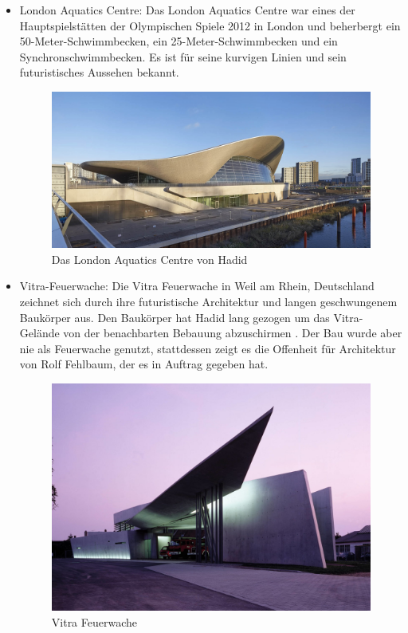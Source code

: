 \documentclass[a4paper]{article}
\begin{document}
\begin{itemize}
\item London Aquatics Centre: Das London Aquatics Centre war eines der
	Hauptspielstätten der Olympischen Spiele 2012 in London und beherbergt ein
	50-Meter-Schwimmbecken, ein 25-Meter-Schwimmbecken und ein
	Synchronschwimmbecken. Es ist für seine kurvigen Linien und sein
	futuristisches Aussehen bekannt.
\begin{figure}[h]
\centering
\includegraphics[width=.5\linewidth]{hadid-aquatics.jpg}
\caption{Das London Aquatics Centre von Hadid \cite{hadid_aquatics_centre}}
\end{figure}


\item Vitra-Feuerwache: Die Vitra Feuerwache in Weil am Rhein, Deutschland
	zeichnet sich durch ihre futuristische Architektur und langen geschwungenem
	Baukörper aus. Den Baukörper hat Hadid lang gezogen um das Vitra-Gelände von
	der benachbarten Bebauung abzuschirmen \cite[S. 26-29]{taschen_zaha_hadid}.
	Der Bau wurde aber nie als Feuerwache genutzt, stattdessen zeigt es die
	Offenheit für Architektur von Rolf Fehlbaum, der es in Auftrag gegeben hat.
\begin{figure}[h]
\centering
\includegraphics[width=.5\linewidth]{hadid-feuerwache.jpg}
\caption{Vitra Feuerwache \cite{hadid_vitra_fire_station}}
\end{figure}



\end{itemize}
\end{document}
